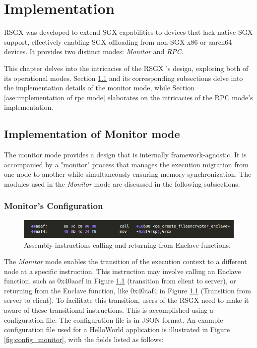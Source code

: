 \documentclass[article, doublespace,nopageskip]{VTthesis} %
\newcommand{\monitor}{RSGX \xspace}
\begin{document}
    \chapter{Implementation} \label{ch:implementation}
    \monitor was developed to extend SGX capabilities to devices that lack native SGX support, effectively enabling SGX offloading from non-SGX x86 or aarch64 devices. It provides two distinct modes: \textit{Monitor} and \textit{RPC}.

    This chapter delves into the intricacies of the \monitor's design, exploring both of its operational modes. Section \ref{ase:implementation of monitor mode} and its corresponding subsections delve into the implementation details of the monitor mode, while Section \ref{ase:implementation of rpc mode} elaborates on the intricacies of the RPC mode's implementation. 
    
    \section{Implementation of Monitor mode} \label{ase:implementation of monitor mode}
    The monitor mode provides a design that is internally framework-agnostic. It is accompanied by a "monitor" process that manages the execution migration  from one node to another while simultaneously ensuring memory synchronization. The modules used in the \textit{Monitor} mode are discussed in the following subsections.
    
    \subsection{Monitor's Configuration} \label{ase: Json Parser}
    
    \begin{figure}[htb]
        \centering
        \includegraphics[scale=2.0]{figures/transisitonal_assembly_inst.png}
        \caption{Assembly instructions calling and returning from Enclave functions.} 
        \label{fig:transition_assembly}
    \end{figure}
 
    The \textit{Monitor} mode enables the transition of the execution context to a different node at a specific instruction. This instruction may involve calling an Enclave function, such as 0x40aaef in Figure \ref{fig:transition_assembly} (transition from client to server), or returning from the Enclave function, like 0x40aaf4 in Figure \ref{fig:transition_assembly} (Transition from server to client). To facilitate this transition, users of the \monitor need to make it aware of these transitional instructions. This is accomplished using a configuration file. The configuration file is in JSON format. An example configuration file used for a HelloWorld application is illustrated in Figure \ref{fig:config_monitor}, with the fields listed as follows:
    
\end{document}
